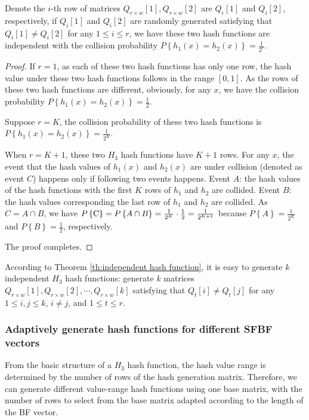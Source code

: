 \documentclass[10pt,journal,compsoc]{IEEEtran}
\newtheorem{proof}{Proof}
\begin{document}
\begin{theorem}
\label{th:independent hash function} Denote the $i$-th row of matrices ${Q_{r \times w}[1]},{Q_{r \times w}[2]}$  are ${Q_i}[1]$ and ${Q_i}[2]$, respectively, if ${Q_i}[1]$ and ${Q_i}[2]$ are randomly generated satisfying that ${Q_i}[1] \ne {Q_i}[2]$ for any $1 \le i \le r$, we have these two hash functions are independent with the collision probability $P\left\{ {{h_1}\left( x \right) = {h_2}\left( x \right)} \right\} = \frac{1}{{{2^r}}}$.
\end{theorem}
\begin{proof}
If $r=1$, as each of these two hash functions has only one row, the hash value under these two hash functions follows in the range $[0,1]$.  As  the rows of these two hash functions are different, obviously, for any $x$, we have the collision probability $P\left\{ {{h_1}\left( x \right) = {h_2}\left( x \right)} \right\} = \frac{1}{2}$.

Suppose $r = K$, the collision probability of these two hash functions is $P\left\{ {{h_1}\left( x \right) = {h_2}\left( x \right)} \right\} = \frac{1}{{{2^K}}}$.

When $r=K+1$, these two $H_3$ hash functions have $K+1$ rows. For any $x$, the event that the hash values of $h_1(x)$ and $h_2(x)$ are under collision (denoted as event $C$) happens only if following two events happens. Event $A$: the hash values of the hash functions with the first $K$ rows of $h_1$ and $h_2$ are collided. Event $B$: the hash values corresponding the last row of $h_1$ and $h_2$ are collided. As $C = A \cap B$, we have $P\left\{ {\rm{C}} \right\} = P\left\{ {A \cap B} \right\} = \frac{1}{{{2^K}}} \cdot \frac{1}{2} = \frac{1}{{{2^{K + 1}}}}$ because $P\left\{ A \right\} = \frac{1}{{{2^K}}}$ and $P\left\{ B \right\} = \frac{1}{2}$, respectively.

The proof completes.
\end{proof}

According to Theorem \ref{th:independent hash function}, it is easy to generate $k$ independent $H_3$ hash functions: generate $k$ matrices ${Q_{r \times w}}[1],{Q_{r \times w}}[2], \cdots ,{Q_{r \times w}}[k]$ satisfying that ${Q_t}[i] \ne {Q_t}[j]$ for any $1 \le i,j \le k$, $i \ne j$, and $1 \le t \le r$.
\subsubsection{Adaptively generate hash functions for different SFBF vectors}
From the basic structure of a $H_3$ hash function, the hash value range is determined by the number of rows of the hash generation matrix. Therefore, we can generate different value-range hash functions using one base matrix, with the number of rows to select from the base matrix adapted according to the length of the BF vector.
\end{document}
